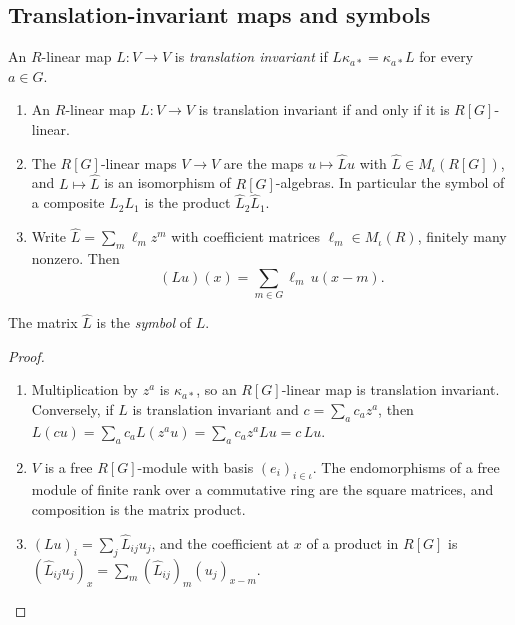 \noindent{}

\subsection{Translation-invariant maps and symbols}

\begin{definition}\label{def:qca-invariant}
An $R$-linear map $L\colon V\to V$ is \emph{translation invariant} if
$L\kappa_{a*}=\kappa_{a*}L$ for every $a\in G$.
\end{definition}

\begin{theorem}[Symbols]\label{thm:qca-symbol}
\begin{enumerate}[label=(\alph*)]
\item An $R$-linear map $L\colon V\to V$ is translation invariant if and only if it is
$R[G]$-linear.
\item The $R[G]$-linear maps $V\to V$ are the maps $u\mapsto\hat Lu$ with $\hat L\in
M_\iota(R[G])$, and $L\mapsto\hat L$ is an isomorphism of $R[G]$-algebras. In particular the
symbol of a composite $L_2L_1$ is the product $\hat L_2\hat L_1$.
\item Write $\hat L=\sum_m\ell_mz^m$ with coefficient matrices $\ell_m\in M_\iota(R)$, finitely
many nonzero. Then
\[(Lu)(x)=\sum_{m\in G}\ell_m\,u(x-m).\]
\end{enumerate}
The matrix $\hat L$ is the \emph{symbol} of $L$.
\end{theorem}

\begin{proof}\leavevmode
\begin{enumerate}[label=(\alph*)]
\item Multiplication by $z^a$ is $\kappa_{a*}$, so an $R[G]$-linear map is translation invariant.
Conversely, if $L$ is translation invariant and $c=\sum_ac_az^a$, then
$L(cu)=\sum_ac_aL(z^au)=\sum_ac_az^aLu=c\,Lu$.
\item $V$ is a free $R[G]$-module with basis $(e_i)_{i\in\iota}$. The endomorphisms of a free
module of finite rank over a commutative ring are the square matrices, and composition is the
matrix product.
\item $(Lu)_i=\sum_j\hat L_{ij}u_j$, and the coefficient at $x$ of a product in $R[G]$ is
$(\hat L_{ij}u_j)_x=\sum_m(\hat L_{ij})_m(u_j)_{x-m}$.
\end{enumerate}
\end{proof}

